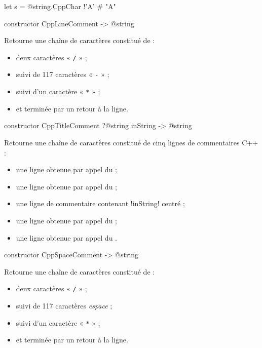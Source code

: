 \begin{galgas3}
let s = @string.CppChar {!'A'} # "A"
\end{galgas3}




\begin{galgas3box}
constructor CppLineComment -> @string
\end{galgas3box}

Retourne une chaîne de caractères constitué de :
\begin{itemize}
  \item deux caractères « \texttt{/} » ;
  \item suivi de 117 caractères « \texttt{-} » ;
  \item suivi d'un caractère « \texttt{*} » ;
  \item et terminée par un retour à la ligne.
\end{itemize}





\begin{galgas3box}
constructor CppTitleComment ?@string inString -> @string
\end{galgas3box}

Retourne une chaîne de caractères constitué de cinq lignes de commentaires C++ :
\begin{itemize}
\item une ligne obtenue par appel du  ;
\item une ligne obtenue par appel du  ;
\item une ligne de commentaire contenant \ggst!inString! centré ;
\item une ligne obtenue par appel du  ;
\item une ligne obtenue par appel du .
\end{itemize}




\begin{galgas3box}
constructor CppSpaceComment -> @string
\end{galgas3box}

Retourne une chaîne de caractères constitué de :
\begin{itemize}
  \item deux caractères « \texttt{/} » ;
  \item suivi de 117 caractères \emph{espace} ;
  \item suivi d'un caractère « \texttt{*} » ;
  \item et terminée par un retour à la ligne.
\end{itemize}

